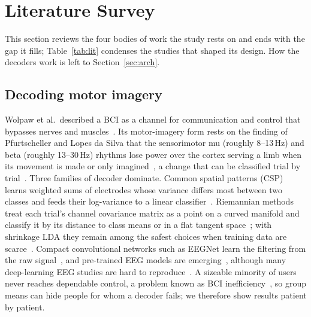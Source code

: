 \section{Literature Survey}
\label{sec:lit}

This section reviews the four bodies of work the study rests on and ends with the gap it
fills; Table~\ref{tab:lit} condenses the studies that shaped its design. How the decoders work
is left to Section~\ref{sec:arch}.

\subsection{Decoding motor imagery}
Wolpaw et al.\ described a BCI as a channel for communication and control that bypasses nerves
and muscles~\cite{wolpaw2002}. Its motor-imagery form rests on the finding of Pfurtscheller and
Lopes da Silva that the sensorimotor mu (roughly 8--13\,Hz) and beta (roughly 13--30\,Hz) rhythms lose
power over the cortex serving a limb when its movement is made or only
imagined~\cite{pfurtscheller1999}, a change that can be classified trial by
trial~\cite{pfurtscheller2001,pfurtscheller2006}. Three families of decoder dominate. Common
spatial patterns (CSP) learns weighted sums of electrodes whose variance differs most between
two classes and feeds their log-variance to a linear
classifier~\cite{ramoser2000,blankertz2008,ang2008fbcsp}. Riemannian methods treat each trial's
channel covariance matrix as a point on a curved manifold and classify it by its distance to
class means or in a flat tangent space~\cite{barachant2012,congedo2017,yger2017}; with shrinkage
LDA they remain among the safest choices when training data are scarce~\cite{lotte2018review}.
Compact convolutional networks such as EEGNet learn the filtering from the raw
signal~\cite{lawhern2018,schirrmeister2017}, and pre-trained EEG models are
emerging~\cite{jiang2024labram,wang2025cbramod}, although many deep-learning EEG studies are hard
to reproduce~\cite{roy2019}. A sizeable minority of users never reaches dependable control, a
problem known as BCI inefficiency~\cite{vidaurre2010,ahn2015,lee2019openbmi}, so group means can
hide people for whom a decoder fails; we therefore show results patient by patient.

